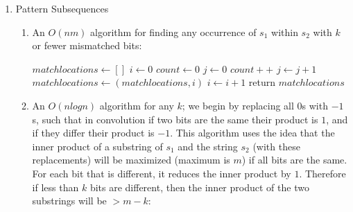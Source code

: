 \documentclass[a4paper]{article}
\begin{document}
\begin{enumerate}
	\begin{proof}
		First, if a statement is satisfiable, then it has a coloring.  Given a statement $S$ consisting of clauses $c_1, ... c_n$ which are satisfiable, we connect it to the three-variable gadget as described above.  If a given clause $c_i$ is satisfiable, that means that it references one or more true literals, or the negation of false literals. WLOG assume it has a true literal $x_i$, which we have connected it to $v_i '$, which would have a false color.  Since $c_i$'s vertex is not connected to $v_i '$ or $w_i$ or any other clauses, it cannot be connected to anything which has the $i$th true color, which means that it can be colored true.  Therefore, a coloring exists if a statement is satisfiable.
		If a coloring exists for a statement whose clauses are connected as above, then it is satisfiable.  Given a graph with vertices for clauses $c_1, ... c_n$, a clause $c_i$ will have a true color.  WLOG say it has the $k$th true color.  This means that it is not connected to any nodes with the $k$th true color: it is not connected to any other clause vertices, and it is also not connected to $v_k$ or $w_k$.  This means that it is connected to $v_k '$, which means that one of its literals is $x_k$, which must be true because $v_k '$ is colored false.
	\end{proof}
\item Pattern Subsequences
	\begin{enumerate}
	\item An $O(nm)$ algorithm for finding any occurrence of $s_1$ within $s_2$ with $k$ or fewer mismatched bits:
		\begin{algorithmic}
		\State $matchlocations \gets [ ]$
		\State $i \gets 0$
			\State $count \gets 0$
			\State $j \gets 0$
					\State $count++$
				\EndIf
				\State $j \gets j + 1$
			\EndFor
				\State $matchlocations \gets (matchlocations, i)$
			\EndIf
			\State $i \gets i + 1$
		\EndFor
		\State return $matchlocations$
		\end{algorithmic}
	\item An $O(n log n)$ algorithm for any $k$; we begin by replacing all $0$s with $-1$s, such that in convolution if two bits are the same their product is $1$, and if they differ their product is $-1$. This algorithm uses the idea that the inner product of a substring of $s_1$ and the string $s_2$ (with these replacements) will be maximized (maximum is $m$) if all bits are the same.  For each bit that is different, it reduces the inner product by $1$.  Therefore if less than $k$ bits are different, then the inner product of the two substrings will be $> m-k$:

\end{enumerate}
\end{enumerate}
\end{document}
